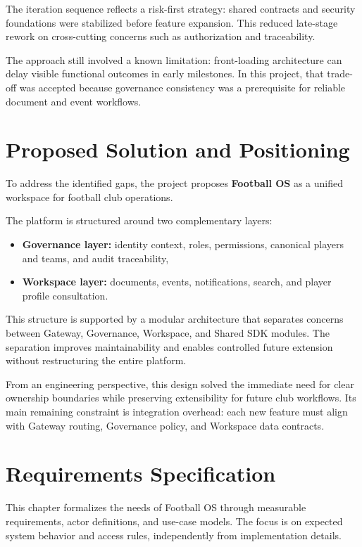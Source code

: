 The iteration sequence reflects a risk-first strategy: shared contracts and
security foundations were stabilized before feature expansion. This reduced
late-stage rework on cross-cutting concerns such as authorization and
traceability.

The approach still involved a known limitation: front-loading architecture can
delay visible functional outcomes in early milestones. In this project, that
trade-off was accepted because governance consistency was a prerequisite for
reliable document and event workflows.

\section{Proposed Solution and Positioning}

To address the identified gaps, the project proposes \textbf{Football OS} as a
unified workspace for football club operations.

The platform is structured around two complementary layers:
\begin{itemize}
    \item \textbf{Governance layer:} identity context, roles, permissions, canonical players and teams, and audit traceability,
    \item \textbf{Workspace layer:} documents, events, notifications, search, and player profile consultation.
\end{itemize}

This structure is supported by a modular architecture that separates concerns
between Gateway, Governance, Workspace, and Shared SDK modules. The separation
improves maintainability and enables controlled future extension without
restructuring the entire platform.

From an engineering perspective, this design solved the immediate need for
clear ownership boundaries while preserving extensibility for future club
workflows. Its main remaining constraint is integration overhead: each new
feature must align with Gateway routing, Governance policy, and Workspace data
contracts.


\section{Requirements Specification}

This chapter formalizes the needs of Football OS through measurable
requirements, actor definitions, and use-case models. The focus is on expected
system behavior and access rules, independently from implementation details.

